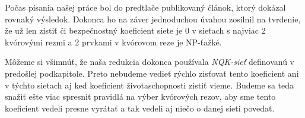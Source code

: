 \vspace{5mm}
Počas písania našej práce bol do predtlače publikovaný článok\cite{lachowski2019},
ktorý dokázal rovnaký výsledok. Dokonca ho na záver jednoduchou úvahou zosilnil
na tvrdenie, že už len zistiť či bezpečnostný koeficient siete je 0
v sieťach s najviac 2 kvórovými rezmi a 2 prvkami v kvórovom reze je NP-ťažké.

Môžeme si všimnúť, že naša redukcia dokonca používala \textit{NQK-sieť} definovanú v predošlej
podkapitole. Preto nebudeme vedieť rýchlo zisťovať tento koeficient ani v týchto sieťach
aj keď koeficient životaschopnosti zistiť vieme.
Budeme sa teda snažiť ešte viac spresniť pravidlá na výber kvórových rezov,
aby sme tento koeficient vedeli presne vyrátať a tak vedeli aj niečo o danej sieti povedať.